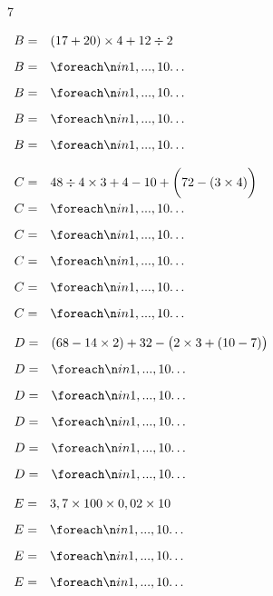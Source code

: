 \documentclass[a4paper]{book}
\begin{document}
{\begin{exerciceNote}{7}
\begin{minipage}{0.3\linewidth}
            \bigskip

            $\begin{array}{ll}
                B = & (17+20)\times 4 + 12\div2 \\[2ex]
                B = & \points[10]\\[2ex]
                B = & \points[10]\\[2ex]
                B = & \points[10]\\[2ex]
                B = & \points[10]
            \end{array}$  
        \end{minipage}
        \vline
        \begin{minipage}{0.35\linewidth}
            $\begin{array}{ll}
                C = & 48\div4\times3+4-10+\bigg(72-(3\times4)\bigg) \\[2ex]
                C = & \points[10]\\[2ex]
                C = & \points[10]\\[2ex]
                C = & \points[10]\\[2ex]
                C = & \points[10]\\[2ex]
                C = & \points[10]
            \end{array}$

            \bigskip

            $\begin{array}{ll}
                D = & (68-14\times2)+32-\big(2\times3+(10-7)\big) \\[2ex]
                D = & \points[10]\\[2ex]
                D = & \points[10]\\[2ex]
                D = & \points[10]\\[2ex]
                D = & \points[10]\\[2ex]
                D = & \points[10]
            \end{array}$
        \end{minipage}
        \vline
        \begin{minipage}{0.3\linewidth}
            $\begin{array}{ll}
                E = & 3,7\times 100 \times 0,02 \times 10 \\[2ex]
                E = & \points[10]\\[2ex]
                E = & \points[10]\\[2ex]
                E = & \points[10]
            \end{array}$


\end{minipage}
\end{exerciceNote}}
\end{document}
